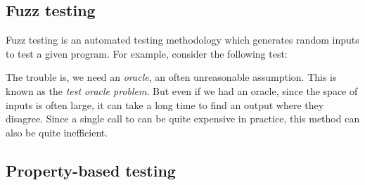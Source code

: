 
\subsection{Fuzz testing}

Fuzz testing is an automated testing methodology which generates random inputs to test a given program. For example, consider the following test:
%
%
The trouble is, we need an \textit{oracle}, an often unreasonable assumption. This is known as the \textit{test oracle problem}. But even if we had an oracle, since the space of inputs is often large, it can take a long time to find an output where they disagree. Since a single call to  can be quite expensive in practice, this method can also be quite inefficient.

\subsection{Property-based testing}\label{subsec:property-based-testing}

